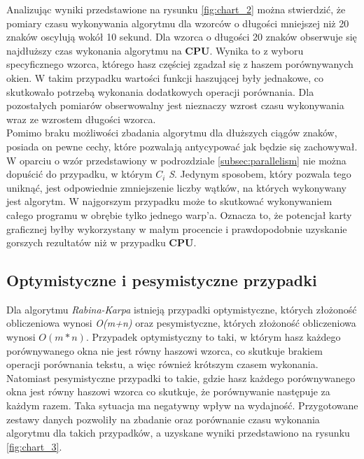Analizując wyniki przedstawione na rysunku \ref{fig:chart_2} można stwierdzić, że pomiary czasu wykonywania algorytmu dla wzorców o długości mniejszej niż 20 znaków oscylują wokół 10 sekund. Dla wzorca o długości 20 znaków obserwuje się najdłuższy czas wykonania algorytmu na \textbf{CPU}. Wynika to z wyboru specyficznego wzorca, którego hasz częściej zgadzał się z haszem porównywanych okien. W takim przypadku wartości funkcji haszującej były jednakowe, co skutkowało potrzebą wykonania dodatkowych operacji porównania. Dla pozostałych pomiarów obserwowalny jest nieznaczy wzrost czasu wykonywania wraz ze wzrostem długości wzorca.\\
Pomimo braku możliwości zbadania algorytmu dla dłuższych ciągów znaków, posiada on pewne cechy, które pozwalają antycypować jak będzie się zachowywał. W oparciu o wzór przedstawiony w podrozdziale \ref{subsec:parallelism} nie można dopuścić do przypadku, w którym \textit{$C_i$} \text{<} \textit{S}. Jedynym sposobem, który pozwala tego uniknąć, jest odpowiednie zmniejszenie liczby wątków, na których wykonywany jest algorytm. W najgorszym przypadku może to skutkować wykonywaniem całego programu w obrębie tylko jednego warp'a. Oznacza to, że potencjał karty graficznej byłby wykorzystany w małym procencie i prawdopodobnie uzyskanie gorszych rezultatów niż w przypadku \textbf{CPU}.

\subsection{Optymistyczne i pesymistyczne przypadki}

Dla algorytmu \textit{Rabina-Karpa} istnieją przypadki optymistyczne, których złożoność obliczeniowa wynosi \textit{O(m+n)} oraz pesymistyczne, których złożoność obliczeniowa wynosi \textit{$O(m*n)$}. Przypadek optymistyczny to taki, w którym hasz każdego porównywanego okna nie jest równy haszowi wzorca, co skutkuje brakiem operacji porównania tekstu, a więc również krótszym czasem wykonania. Natomiast pesymistyczne przypadki to takie, gdzie hasz każdego porównywanego okna jest równy haszowi wzorca co skutkuje, że porównywanie  następuje za każdym razem. Taka sytuacja ma negatywny wpływ na wydajność. Przygotowane zestawy danych pozwoliły na zbadanie oraz porównanie czasu wykonania algorytmu dla takich przypadków, a uzyskane wyniki przedstawiono na rysunku \ref{fig:chart_3}.

